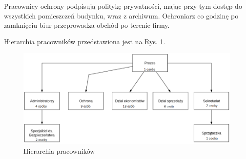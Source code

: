 Pracownicy ochrony podpisują politykę prywatności, mając przy tym dostęp do wszystkich pomieszczeń budynku, wraz z archiwum. Ochroniarz co godzinę po zamknięciu biur przeprowadza obchód po terenie firmy.

Hierarchia pracowników przedstawiona jest na Rys. \ref{schemat:hierarchia_pracownikow}.
\begin{figure}[!h]
	\includegraphics[width=15cm]{Hierarchia_pracownikow.png}
	\caption{Hierarchia pracowników}
	\label{schemat:hierarchia_pracownikow}
\end{figure}
\newpage
